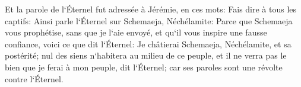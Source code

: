\verse Et la parole de l`Éternel fut adressée à Jérémie, en ces mots: 
\verse Fais dire à tous les captifs: Ainsi parle l`Éternel sur Schemaeja, Néchélamite: Parce que Schemaeja vous prophétise, sans que je l`aie envoyé, et qu`il vous inspire une fausse confiance, 
\verse voici ce que dit l`Éternel: Je châtierai Schemaeja, Néchélamite, et sa postérité; nul des siens n`habitera au milieu de ce peuple, et il ne verra pas le bien que je ferai à mon peuple, dit l`Éternel; car ses paroles sont une révolte contre l`Éternel. 

\chapter{}

